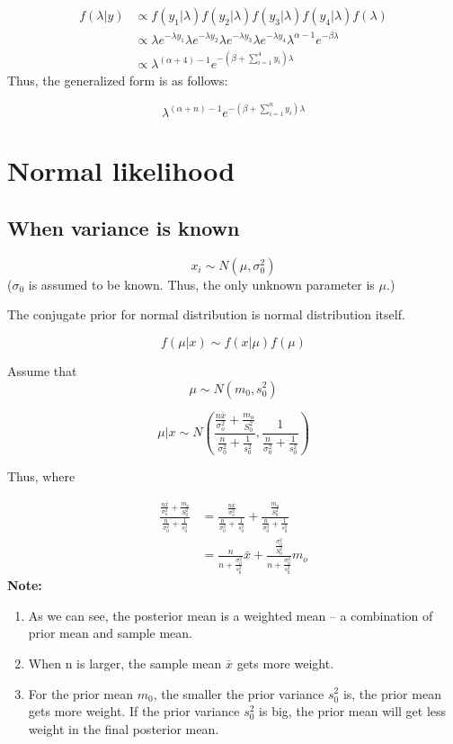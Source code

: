 \documentclass[
]{book}
\begin{document}
\[\begin{aligned} f(\lambda | y) &\propto f(y_1|\lambda)f(y_2|\lambda)f(y_3|\lambda)f(y_4|\lambda)    f(\lambda) \\ &\propto \lambda e^{-\lambda y_1} \lambda e^{-\lambda y_2}\lambda e^{-\lambda y_3} \lambda e^{-\lambda y_4}   \lambda^{\alpha-1}e^{-\beta \lambda} \\ &\propto \lambda^{(\alpha+4)-1} e^{-(\beta+\sum_{i=1}^4 y_i)\lambda } \end{aligned}\]
Thus, the generalized form is as follows:

\[\lambda^{(\alpha+n)-1} e^{-(\beta+\sum_{i=1}^n y_i)\lambda }\]

\hypertarget{normal-likelihood}{%
\section{Normal likelihood}\label{normal-likelihood}}

\hypertarget{when-variance-is-known}{%
\subsection{When variance is known}\label{when-variance-is-known}}

\[x_i \sim N(\mu, \sigma_0^2)\]
(\(\sigma_0\) is assumed to be known. Thus, the only unknown parameter is \(\mu\).)

The conjugate prior for normal distribution is normal distribution itself.

\[f(\mu |x) \sim f(x|\mu) f(\mu)\]

Assume that
\[\mu \sim N(m_0,s_0^2)\]

\[\mu|x \sim N(\frac{\frac{n \bar{x}}{\sigma_o^2}+\frac{m_o}{S_0^2}}{\frac{n}{\sigma_0^2}+\frac{1}{s_0^2}},\frac{1}{\frac{n}{\sigma_0^2}+\frac{1}{s_0^2}})\]

Thus, where

\[\begin{aligned} \frac{\frac{n \bar{x}}{\sigma_o^2}+\frac{m_o}{S_0^2}}{\frac{n}{\sigma_0^2}+\frac{1}{s_0^2}}&=\frac{\frac{n \bar{x}}{\sigma_o^2}}{\frac{n}{\sigma_0^2}+\frac{1}{s_0^2}}+\frac{\frac{m_o}{S_0^2}}{\frac{n}{\sigma_0^2}+\frac{1}{s_0^2}}\\ &=\frac{n}{n+\frac{\sigma_0^2}{s_0^2}} \bar{x}+\frac{\frac{\sigma_0^2}{S_0^2}}{n+\frac{\sigma_0^2}{s_0^2}}m_o \end{aligned}\]
\textbf{Note:}

\begin{enumerate}
\def\labelenumi{(\arabic{enumi})}
\item
  As we can see, the posterior mean is a weighted mean -- a combination of prior mean and sample mean.
\item
  When n is larger, the sample mean \(\bar{x}\) gets more weight.
\item
  For the prior mean \(m_0\), the smaller the prior variance \(s_0^2\) is, the prior mean gets more weight. If the prior variance \(s_0^2\) is big, the prior mean will get less weight in the final posterior mean.
\end{enumerate}
\end{document}
